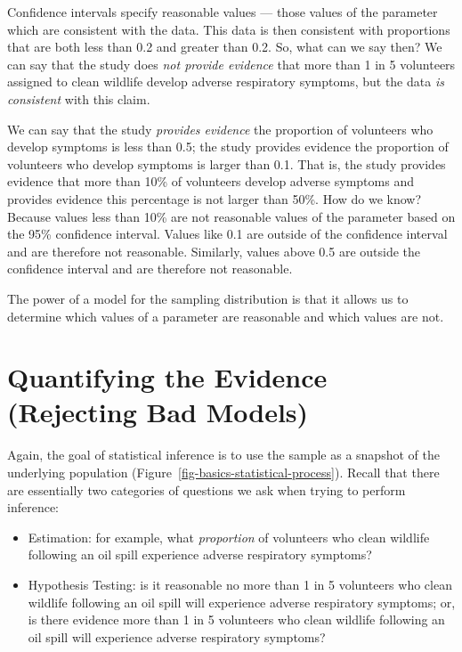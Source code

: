 \documentclass[
  letterpaper,
  DIV=11,
  numbers=noendperiod]{scrreprt}
\providecommand{\tightlist}{%
  \setlength{\itemsep}{0pt}\setlength{\parskip}{0pt}}\usepackage{longtable,booktabs,array}
\theoremstyle{definition}
\theoremstyle{definition}
\theoremstyle{plain}
\theoremstyle{remark}
\begin{document}
Confidence intervals specify reasonable values --- those values of the
parameter which are consistent with the data. This data is then
consistent with proportions that are both less than 0.2 and greater than
0.2. So, what can we say then? We can say that the study does \emph{not
provide evidence} that more than 1 in 5 volunteers assigned to clean
wildlife develop adverse respiratory symptoms, but the data \emph{is
consistent} with this claim.

We can say that the study \emph{provides evidence} the proportion of
volunteers who develop symptoms is less than 0.5; the study provides
evidence the proportion of volunteers who develop symptoms is larger
than 0.1. That is, the study provides evidence that more than 10\% of
volunteers develop adverse symptoms and provides evidence this
percentage is not larger than 50\%. How do we know? Because values less
than 10\% are not reasonable values of the parameter based on the 95\%
confidence interval. Values like 0.1 are outside of the confidence
interval and are therefore not reasonable. Similarly, values above 0.5
are outside the confidence interval and are therefore not reasonable.

The power of a model for the sampling distribution is that it allows us
to determine which values of a parameter are reasonable and which values
are not.

\hypertarget{sec-nulldistns}{%
\chapter{Quantifying the Evidence (Rejecting Bad
Models)}\label{sec-nulldistns}}

Again, the goal of statistical inference is to use the sample as a
snapshot of the underlying population
(Figure~\ref{fig-basics-statistical-process}). Recall that there are
essentially two categories of questions we ask when trying to perform
inference:

\begin{itemize}
\tightlist
\item
  Estimation: for example, what \emph{proportion} of volunteers who
  clean wildlife following an oil spill experience adverse respiratory
  symptoms?
\item
  Hypothesis Testing: is it reasonable no more than 1 in 5 volunteers
  who clean wildlife following an oil spill will experience adverse
  respiratory symptoms; or, is there evidence more than 1 in 5
  volunteers who clean wildlife following an oil spill will experience
  adverse respiratory symptoms?
\end{itemize}
\end{document}
